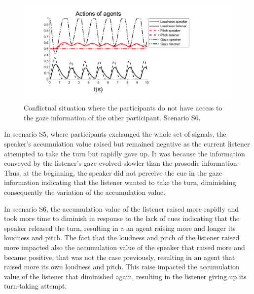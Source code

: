 

\begin{figure}
  \centering
  \includegraphics[width=\linewidth]{figure/adapt_nogaze.pdf}
  \caption{Conflictual situation where the participants do not have access to the gaze information of the other participant. Scenario S6.}
  \label{adapt_nogaze}
\end{figure}

In scenario S5, where participants exchanged the whole set of signals, the speaker's accumulation value raised but remained negative as the current listener attempted to take the turn but rapidly gave up. It was because the information conveyed by the listener's gaze evolved slowler than the prosodic information. Thus, at the beginning, the speaker did not perceive the cue in the gaze information indicating that the listener wanted to take the turn, diminishing consequently the variation of the accumulation value. 

In scenario S6, the accumulation value of the listener raised more rapidly and took more time to diminish in response to the lack of cues indicating that the speaker released the turn, resulting in a an agent raising more and longer its loudness and pitch. The fact that the loudness and pitch of the listener raised more impacted also the accumulation value of the speaker that raised more and became positive, that was not the case previously, resulting in an agent that raised more its own loudness and pitch. This raise impacted the accumulation value of the listener that diminished again, resulting in the listener giving up its turn-taking attempt. 

